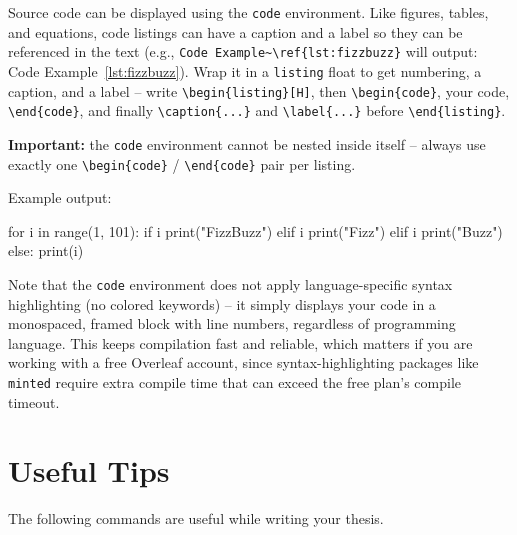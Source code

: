 Source code can be displayed using the \texttt{code} environment. Like figures, tables, and equations, code listings can have a caption and a label so they can be referenced in the text (e.g., \texttt{Code Example\textasciitilde\textbackslash ref\{lst:fizzbuzz\}} will output: Code Example~\ref{lst:fizzbuzz}). Wrap it in a \texttt{listing} float to get numbering, a caption, and a label -- write \texttt{\textbackslash begin\{listing\}[H]}, then \texttt{\textbackslash begin\{code\}}, your code, \texttt{\textbackslash end\{code\}}, and finally \texttt{\textbackslash caption\{...\}} and \texttt{\textbackslash label\{...\}} before \texttt{\textbackslash end\{listing\}}.

\textbf{Important:} the \texttt{code} environment cannot be nested inside itself -- always use exactly one \texttt{\textbackslash begin\{code\}} / \texttt{\textbackslash end\{code\}} pair per listing.

Example output:

\begin{listing}[H]
\begin{code}
for i in range(1, 101):
    if i %
        print("FizzBuzz")
    elif i %
        print("Fizz")
    elif i %
        print("Buzz")
    else:
        print(i)
\end{code}
\caption{Example Python code}
\label{lst:fizzbuzz}
\end{listing}

Note that the \texttt{code} environment does not apply language-specific syntax highlighting (no colored keywords) -- it simply displays your code in a monospaced, framed block with line numbers, regardless of programming language. This keeps compilation fast and reliable, which matters if you are working with a free Overleaf account, since syntax-highlighting packages like \texttt{minted} require extra compile time that can exceed the free plan's compile timeout.


\section{Useful Tips}

The following commands are useful while writing your thesis.

